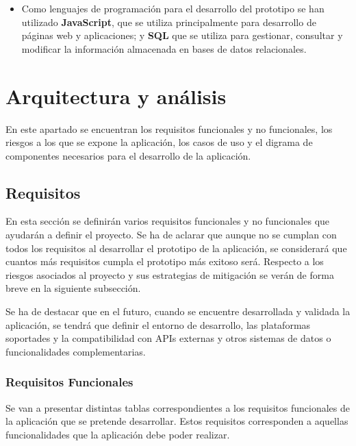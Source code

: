 \begin{itemize}
        \item Como lenguajes de programación para el desarrollo del prototipo se han utilizado \textbf{JavaScript}, que se utiliza principalmente para desarrollo de páginas web y aplicaciones; y \textbf{SQL} que se utiliza para gestionar, consultar y modificar la información almacenada en bases de datos relacionales. 
        

    \end{itemize}

    

    
    \section{Arquitectura y análisis}\label{arq_ana}
    En este apartado se encuentran los requisitos funcionales y no funcionales, los riesgos a los que se expone la aplicación, los casos de uso y el digrama de componentes necesarios para el desarrollo de la aplicación.

        \subsection{Requisitos}
En esta sección se definirán varios requisitos funcionales y no funcionales que ayudarán a definir el proyecto. Se ha de aclarar que aunque no se cumplan con todos los requisitos al desarrollar el prototipo de la aplicación, se considerará que cuantos más requisitos cumpla el prototipo más exitoso será. Respecto a los riesgos asociados al proyecto y sus estrategias de mitigación se verán de forma breve en la siguiente subsección.

Se ha de destacar que en el futuro, cuando se encuentre desarrollada y validada la aplicación, se tendrá que definir el entorno de desarrollo, las plataformas soportades y la compatibilidad con APIs externas y otros sistemas de datos o funcionalidades complementarias.
    
    \subsubsection{Requisitos Funcionales}
Se van a presentar distintas tablas correspondientes a los requisitos funcionales de la aplicación que se pretende desarrollar. Estos requisitos corresponden a aquellas funcionalidades que la aplicación debe poder realizar.

